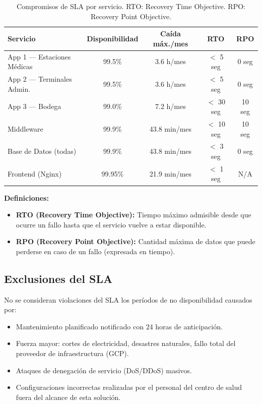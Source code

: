 \documentclass[11pt,a4paper]{article}
\begin{document}
\begin{table}[h!]
\centering
\begin{tabular}{lcccc}
\toprule
\textbf{Servicio} & \textbf{Disponibilidad} & \textbf{Caída máx./mes} & \textbf{RTO} & \textbf{RPO} \\
\midrule
App 1 — Estaciones Médicas   & 99.5\% & 3.6 h/mes  & $<$ 5 seg  & 0 seg \\
App 2 — Terminales Admin.    & 99.5\% & 3.6 h/mes  & $<$ 5 seg  & 0 seg \\
App 3 — Bodega               & 99.0\% & 7.2 h/mes  & $<$ 30 seg & 10 seg \\
Middleware                   & 99.9\% & 43.8 min/mes & $<$ 10 seg & 10 seg \\
Base de Datos (todas)        & 99.9\% & 43.8 min/mes & $<$ 3 seg  & 0 seg \\
Frontend (Nginx)             & 99.95\% & 21.9 min/mes & $<$ 1 seg & N/A \\
\bottomrule
\end{tabular}
\caption{Compromisos de SLA por servicio. RTO: Recovery Time Objective. RPO: Recovery Point Objective.}
\end{table}

\textbf{Definiciones:}
\begin{itemize}
    \item \textbf{RTO (Recovery Time Objective):} Tiempo máximo admisible desde
          que ocurre un fallo hasta que el servicio vuelve a estar disponible.
    \item \textbf{RPO (Recovery Point Objective):} Cantidad máxima de datos que
          puede perderse en caso de un fallo (expresada en tiempo).
\end{itemize}

\subsection{Exclusiones del SLA}

No se consideran violaciones del SLA los períodos de no disponibilidad causados por:
\begin{itemize}
    \item Mantenimiento planificado notificado con 24 horas de anticipación.
    \item Fuerza mayor: cortes de electricidad, desastres naturales, fallo total del
          proveedor de infraestructura (GCP).
    \item Ataques de denegación de servicio (DoS/DDoS) masivos.
    \item Configuraciones incorrectas realizadas por el personal del centro de salud
          fuera del alcance de esta solución.
\end{itemize}
\end{document}
